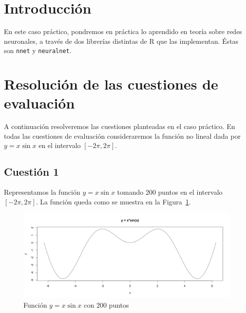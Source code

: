\documentclass[12pt,a4paper,twoside,openright,titlepage,final]{article}
\author{José Ignacio Escribano}
\title{}
\begin{document}
\setcounter{page}{1}


\listoffigures
\thispagestyle{empty}
\newpage

\tableofcontents
\thispagestyle{empty}
\newpage


\setcounter{page}{1}

\section{Introducción}

En este caso práctico, pondremos en práctica lo aprendido en teoría sobre redes neuronales, a través de dos librerías distintas de R que las implementan. Éstas son \texttt{nnet} y \texttt{neuralnet}.

\section{Resolución de las cuestiones de evaluación}

A continuación resolveremos las cuestiones planteadas en el caso práctico. En todas las cuestiones de evaluación consideraremos la función no lineal dada por $y = x \sin x$ en el intervalo $[-2\pi, 2\pi]$.

\subsection{Cuestión 1}
Representamos la función $y = x \sin x$ tomando 200 puntos en el intervalo $[-2\pi, 2\pi]$. La función queda como se muestra en la Figura~\ref{fig:funcion_con_type}.\\

\begin{figure}[tbph!]
\centering
\includegraphics[width=0.8\linewidth]{imagenes/funcion_con_type}
\caption{Función $y = x\sin x$ con 200 puntos}
\label{fig:funcion_con_type}
\end{figure}
\end{document}
